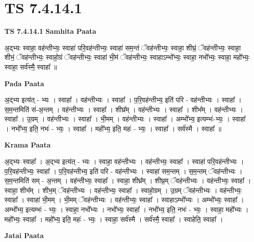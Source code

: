 \documentclass[17pt]{extarticle}
\begin{document}
\section{ TS 7.4.14.1 }

\textbf{TS 7.4.14.1 } \newline
\textbf{Samhita Paata} \newline

अ॒द्भ्यः स्वाहा॒ वह॑न्तीभ्यः॒ स्वाहा॑ परि॒वह॑न्तीभ्यः॒ स्वाहा॑ सम॒न्तं ॅवह॑न्तीभ्यः॒ स्वाहा॒ शीघ्रं॒ ॅवह॑न्तीभ्यः॒ स्वाहा॒ शीभं॒ ॅवह॑न्तीभ्यः॒ स्वाहो॒ग्रं ॅवह॑न्तीभ्यः॒ स्वाहा॑ भी॒मं ॅवह॑न्तीभ्यः॒ स्वाहाऽम्भो᳚भ्यः॒ स्वाहा॒ नभो᳚भ्यः॒ स्वाहा॒ महो᳚भ्यः॒ स्वाहा॒ सर्व॑स्मै॒ स्वाहा᳚ ॥ \newline

\textbf{Pada Paata} \newline

अ॒द्भ्य इत्य॑त् - भ्यः । स्वाहा᳚ । वह॑न्तीभ्यः । स्वाहा᳚ । प॒रि॒वह॑न्तीभ्य॒ इति॑ परि - वह॑न्तीभ्यः । स्वाहा᳚ । स॒म॒न्तमिति॑ सं-अ॒न्तम् । वह॑न्तीभ्यः । स्वाहा᳚ । शीघ्र᳚म् । वह॑न्तीभ्यः । स्वाहा᳚ । शीभ᳚म् । वह॑न्तीभ्यः । स्वाहा᳚ । उ॒ग्रम् । वह॑न्तीभ्यः । स्वाहा᳚ । भी॒मम् । वह॑न्तीभ्यः । स्वाहा᳚ । अम्भो᳚भ्य॒ इत्यम्भः॑-भ्यः॒ । स्वाहा᳚ । नभो᳚भ्य॒ इति॒ नभः॑ - भ्यः॒ । स्वाहा᳚ । महो᳚भ्य॒ इति॒ महः॑ - भ्यः॒ । स्वाहा᳚ । सर्व॑स्मै । स्वाहा᳚ ॥  \newline


\textbf{Krama Paata} \newline

अ॒द्भ्यः स्वाहा᳚ । अ॒द्भ्य इत्य॑त् - भ्यः । स्वाहा॒ वह॑न्तीभ्यः । वह॑न्तीभ्यः॒ स्वाहा᳚ । स्वाहा॑ परि॒वह॑न्तीभ्यः । 
प॒रि॒वह॑न्तीभ्यः॒ स्वाहा᳚ । प॒रि॒वह॑न्तीभ्य॒ इति॑ परि - वह॑न्तीभ्यः । स्वाहा॑ सम॒न्तम् । स॒म॒न्तम् ॅवह॑न्तीभ्यः । स॒म॒न्तमिति॑ सम् - अ॒न्तम् । वह॑न्तीभ्यः॒ स्वाहा᳚ । स्वाहा॒ शीघ्र᳚म् । शीघ्र॒म् ॅवह॑न्तीभ्यः । वह॑न्तीभ्यः॒ स्वाहा᳚ । स्वाहा॒ शीभ᳚म् । शीभ॒म् ॅवह॑न्तीभ्यः । वह॑न्तीभ्यः॒ स्वाहा᳚ । स्वाहो॒ग्रम् । उ॒ग्रम् ॅवह॑न्तीभ्यः । वह॑न्तीभ्यः॒ स्वाहा᳚ । स्वाहा॑ भी॒मम् । भी॒मम् ॅवह॑न्तीभ्यः । वह॑न्तीभ्यः॒ स्वाहा᳚ । स्वाहाऽम्भो᳚भ्यः । अम्भो᳚भ्यः॒ स्वाहा᳚ । अम्भो᳚भ्य॒ इत्यम्भः॑ - भ्यः॒ । स्वाहा॒ नभो᳚भ्यः । नभो᳚भ्यः॒ स्वाहा᳚ । नभो᳚भ्य॒ इति॒ नभः॑ - भ्यः॒ । स्वाहा॒ महो᳚भ्यः । महो᳚भ्यः॒ स्वाहा᳚ । महो᳚भ्य॒ इति॒ महः॑ - भ्यः॒ । स्वाहा॒ सर्व॑स्मै । सर्व॑स्मै॒ स्वाहा᳚ । स्वाहेति॒ स्वाहा᳚ । \newline

\textbf{Jatai Paata} \newline
\end{document}
